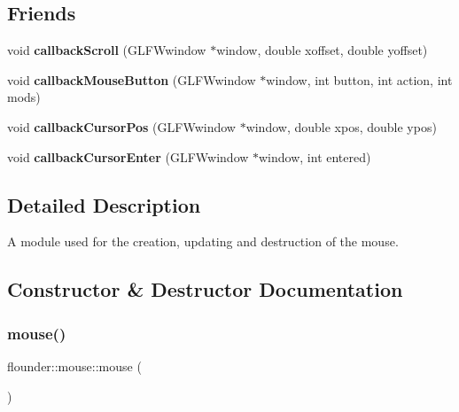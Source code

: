\subsection*{Friends}
\begin{DoxyCompactItemize}
\item 
\mbox{\label{classflounder_1_1mouse_a2050f22852bcbd00f45bbf50b2c307c8}} 
void {\bfseries callback\+Scroll} (G\+L\+F\+Wwindow $\ast$window, double xoffset, double yoffset)
\item 
\mbox{\label{classflounder_1_1mouse_a457df735d06d8eccd01441e30259ffe2}} 
void {\bfseries callback\+Mouse\+Button} (G\+L\+F\+Wwindow $\ast$window, int button, int action, int mods)
\item 
\mbox{\label{classflounder_1_1mouse_a2e7012121aefa8ec5b5d77a99f0a1bcd}} 
void {\bfseries callback\+Cursor\+Pos} (G\+L\+F\+Wwindow $\ast$window, double xpos, double ypos)
\item 
\mbox{\label{classflounder_1_1mouse_a3c957859727233db31fe043bede78aff}} 
void {\bfseries callback\+Cursor\+Enter} (G\+L\+F\+Wwindow $\ast$window, int entered)
\end{DoxyCompactItemize}


\subsection{Detailed Description}
A module used for the creation, updating and destruction of the mouse. 



\subsection{Constructor \& Destructor Documentation}
\mbox{\label{classflounder_1_1mouse_a60e59355a55844e8ca559e2f6b9c82e9}} 
\subsubsection{\texorpdfstring{mouse()}{mouse()}}
{\footnotesize\ttfamily flounder\+::mouse\+::mouse (\begin{DoxyParamCaption}{ }\end{DoxyParamCaption})}



